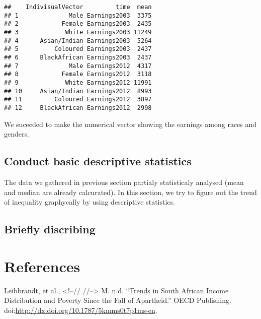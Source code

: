 \documentclass[]{article}
\begin{document}
\begin{verbatim}
##    IndivisualVector         time  mean
## 1              Male Earnings2003  3375
## 2            Female Earnings2003  2435
## 3             White Earnings2003 11249
## 4      Asian/Indian Earnings2003  5264
## 5          Coloured Earnings2003  2437
## 6      BlackAfrican Earnings2003  2437
## 7              Male Earnings2012  4317
## 8            Female Earnings2012  3118
## 9             White Earnings2012 11991
## 10     Asian/Indian Earnings2012  8993
## 11         Coloured Earnings2012  3897
## 12     BlackAfrican Earnings2012  2998
\end{verbatim}

We suceeded to make the numerical vector showing the earnings among
races and genders.

\subsection{Conduct basic descriptive
statistics}\label{conduct-basic-descriptive-statistics}

The data we gathered in previous section partialy statisticaly analysed
(mean and median are already calcurated). In this section, we try to
figure out the trend of inequality graphycally by using descriptive
statistics.

\subsection{Briefly discribing}\label{briefly-discribing}

\section*{References}\label{references}

\hypertarget{refs}{}
\hypertarget{ref-Leibbrandt}{}
Leibbrandt, et al., \textless{}!--// //--\textgreater{} M. n.d. ``Trends
in South African Income Distribution and Poverty Since the Fall of
Apartheid.'' OECD Publishing.
doi:\href{https://doi.org/http://dx.doi.org/10.1787/5kmms0t7p1ms-en}{http://dx.doi.org/10.1787/5kmms0t7p1ms-en}.
\end{document}

